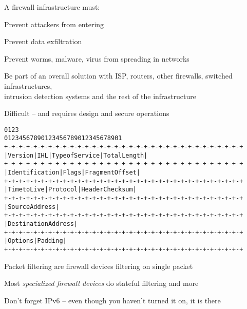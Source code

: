 \documentclass[Screen16to9,17pt]{foils}
\begin{document}
\begin{list1}
\item A firewall infrastructure must:
\begin{list2}
\item Prevent attackers from entering
\item Prevent data exfiltration
\item Prevent worms, malware, virus from spreading in networks
\item Be part of an overall solution with ISP, routers, other firewalls, switched infrastructures,\\
  intrusion detection systems and the rest of the infrastructure
\end{list2}
\end{list1}

\vskip 5mm
\centerline{Difficult -- and requires design and secure operations}



\begin{alltt}\footnotesize
0                   1                   2                   3
0 1 2 3 4 5 6 7 8 9 0 1 2 3 4 5 6 7 8 9 0 1 2 3 4 5 6 7 8 9 0 1
+-+-+-+-+-+-+-+-+-+-+-+-+-+-+-+-+-+-+-+-+-+-+-+-+-+-+-+-+-+-+-+-+
|Version|  IHL  |Type of Service|          Total Length         |
+-+-+-+-+-+-+-+-+-+-+-+-+-+-+-+-+-+-+-+-+-+-+-+-+-+-+-+-+-+-+-+-+
|         Identification        |Flags|      Fragment Offset    |
+-+-+-+-+-+-+-+-+-+-+-+-+-+-+-+-+-+-+-+-+-+-+-+-+-+-+-+-+-+-+-+-+
|  Time to Live |    Protocol   |         Header Checksum       |
+-+-+-+-+-+-+-+-+-+-+-+-+-+-+-+-+-+-+-+-+-+-+-+-+-+-+-+-+-+-+-+-+
|                       Source Address                          |
+-+-+-+-+-+-+-+-+-+-+-+-+-+-+-+-+-+-+-+-+-+-+-+-+-+-+-+-+-+-+-+-+
|                    Destination Address                        |
+-+-+-+-+-+-+-+-+-+-+-+-+-+-+-+-+-+-+-+-+-+-+-+-+-+-+-+-+-+-+-+-+
|                    Options                    |    Padding    |
+-+-+-+-+-+-+-+-+-+-+-+-+-+-+-+-+-+-+-+-+-+-+-+-+-+-+-+-+-+-+-+-+
\end{alltt}

\begin{list1}
\item Packet filtering are firewall devices filtering on single packet
\item Most \emph{specialized firewall devices} do stateful filtering and more
\item Don't forget IPv6 -- even though you haven't turned it on, it is there
\end{list1}
\end{document}
